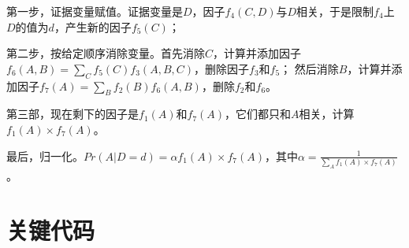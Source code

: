 \documentclass[10pt,letterpaper]{ctexart}
\begin{document}
  \par 第一步，证据变量赋值。证据变量是$D$，因子$f_4(C,D)$与$D$相关，于是限制$f_4$上$D$的值为$d$，产生新的因子$f_5(C)$；
  \par 第二步，按给定顺序消除变量。首先消除$C$，计算并添加因子$f_6(A,B) = \sum_Cf_5(C)f_3(A,B,C)$，删除因子$f_3$和$f_5$；
  然后消除$B$，计算并添加因子$f_7(A)=\sum_B f_2(B)f_6(A,B)$，删除$f_2$和$f_6$。
  \par 第三部，现在剩下的因子是$f_1(A)$和$f_7(A)$，它们都只和$A$相关，计算$f_1(A)\times f_7(A)$。
  \par 最后，归一化。$Pr(A|D=d)=\alpha f_1(A)\times f_7(A)$，其中$\alpha=\frac{1}{\sum_A f_1(A)\times f_7(A)}$。

\section{关键代码}
\end{document}
